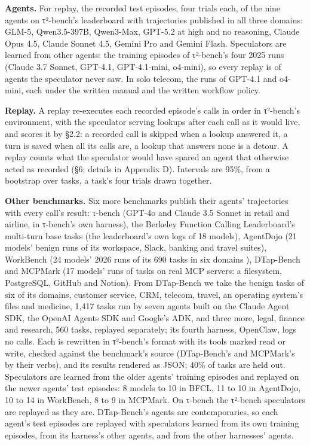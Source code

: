 \documentclass[10pt,twocolumn,letterpaper]{article}
\newcommand{\runin}[1]{{\sffamily\bfseries\color{accent}#1}}
\begin{document}
\runin{Agents.} For replay, the recorded test episodes, four trials each, of the nine agents on τ²-bench's leaderboard with trajectories published in all three domains: GLM-5, Qwen3.5-397B, Qwen3-Max, GPT-5.2 at high and no reasoning, Claude Opus 4.5, Claude Sonnet 4.5, Gemini Pro and Gemini Flash. Speculators are learned from other agents: the training episodes of τ²-bench's four 2025 runs (Claude 3.7 Sonnet, GPT-4.1, GPT-4.1-mini, o4-mini), so every replay is of agents the speculator never saw. In solo telecom, the runs of GPT-4.1 and o4-mini, each under the written manual and the written workflow policy.

\runin{Replay.} A replay re-executes each recorded episode's calls in order in τ²-bench's environment, with the speculator serving lookups after each call as it would live, and scores it by §2.2: a recorded call is skipped when a lookup answered it, a turn is saved when all its calls are, a lookup that answers none is a detour. A replay counts what the speculator would have spared an agent that otherwise acted as recorded (§6; details in Appendix D). Intervals are 95\%, from a bootstrap over tasks, a task's four trials drawn together.

\runin{Other benchmarks.} Six more benchmarks publish their agents' trajectories with every call's result: τ-bench \citep{yao2024taubench} (GPT-4o and Claude 3.5 Sonnet in retail and airline, in τ-bench's own harness), the Berkeley Function Calling Leaderboard's multi-turn base tasks \citep{patil2025bfcl} (the leaderboard's own logs of 18 models), AgentDojo \citep{debenedetti2024agentdojo} (21 models' benign runs of its workspace, Slack, banking and travel suites), WorkBench \citep{styles2024workbench} (24 models' 2026 runs of its 690 tasks in six domains \citep{styles2026workbenchrevisited}), DTap-Bench \citep{chen2026dtap} and MCPMark \citep{wu2025mcpmark} (17 models' runs of tasks on real MCP servers: a filesystem, PostgreSQL, GitHub and Notion). From DTap-Bench we take the benign tasks of six of its domains, customer service, CRM, telecom, travel, an operating system's files and medicine, 1,417 tasks run by seven agents built on the Claude Agent SDK, the OpenAI Agents SDK and Google's ADK, and three more, legal, finance and research, 560 tasks, replayed separately; its fourth harness, OpenClaw, logs no calls. Each is rewritten in τ²-bench's format with its tools marked read or write, checked against the benchmark's source (DTap-Bench's and MCPMark's by their verbs), and its results rendered as JSON; 40\% of tasks are held out. Speculators are learned from the older agents' training episodes and replayed on the newer agents' test episodes: 8 models to 10 in BFCL, 11 to 10 in AgentDojo, 10 to 14 in WorkBench, 8 to 9 in MCPMark. On τ-bench the τ²-bench speculators are replayed as they are. DTap-Bench's agents are contemporaries, so each agent's test episodes are replayed with speculators learned from its own training episodes, from its harness's other agents, and from the other harnesses' agents.
\end{document}
